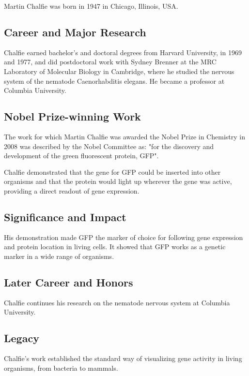 Martin Chalfie was born in 1947 in Chicago, Illinois, USA.

\subsection*{Career and Major Research}

Chalfie earned bachelor's and doctoral degrees from Harvard University, in 1969 and 1977, and did postdoctoral work with Sydney Brenner at the MRC Laboratory of Molecular Biology in Cambridge, where he studied the nervous system of the nematode Caenorhabditis elegans. He became a professor at Columbia University.

\subsection*{Nobel Prize-winning Work}

The work for which Martin Chalfie was awarded the Nobel Prize in Chemistry in 2008 was described by the Nobel Committee as: "for the discovery and development of the green fluorescent protein, GFP".

Chalfie demonstrated that the gene for GFP could be inserted into other organisms and that the protein would light up wherever the gene was active, providing a direct readout of gene expression.

\subsection*{Significance and Impact}

His demonstration made GFP the marker of choice for following gene expression and protein location in living cells. It showed that GFP works as a genetic marker in a wide range of organisms.

\subsection*{Later Career and Honors}

Chalfie continues his research on the nematode nervous system at Columbia University.

\subsection*{Legacy}

Chalfie's work established the standard way of visualizing gene activity in living organisms, from bacteria to mammals.

